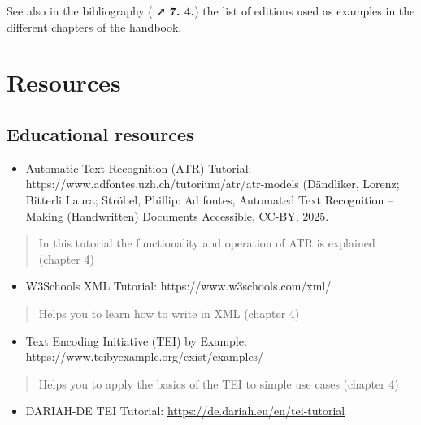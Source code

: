 \documentclass[
  letterpaper,
  DIV=11,
  numbers=noendperiod]{scrreprt}
\providecommand{\tightlist}{%
  \setlength{\itemsep}{0pt}\setlength{\parskip}{0pt}}\usepackage{longtable,booktabs,array}
\begin{document}
See also in the bibliography ( ➚ \textbf{7. 4.}) the list of editions
used as examples in the different chapters of the handbook.

\section{Resources}\label{resources}

\subsection{Educational resources}\label{educational-resources}

\begin{itemize}
\tightlist
\item
  Automatic Text Recognition (ATR)-Tutorial:
  https://www.adfontes.uzh.ch/tutorium/atr/atr-models (Dändliker,
  Lorenz; Bitterli Laura; Ströbel, Phillip: Ad fontes, Automated Text
  Recognition -- Making (Handwritten) Documents Accessible, CC-BY, 2025.
\end{itemize}

\begin{quote}
In this tutorial the functionality and operation of ATR is explained
(chapter 4)
\end{quote}

\begin{itemize}
\tightlist
\item
  W3Schools XML Tutorial: https://www.w3schools.com/xml/
\end{itemize}

\begin{quote}
Helps you to learn how to write in XML (chapter 4)
\end{quote}

\begin{itemize}
\tightlist
\item
  Text Encoding Initiative (TEI) by Example:
  https://www.teibyexample.org/exist/examples/
\end{itemize}

\begin{quote}
Helps you to apply the basics of the TEI to simple use cases (chapter 4)
\end{quote}

\begin{itemize}
\tightlist
\item
  DARIAH-DE TEI Tutorial: \url{https://de.dariah.eu/en/tei-tutorial}
\end{itemize}
\end{document}
